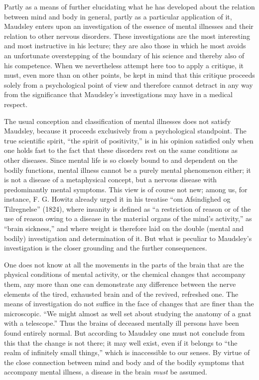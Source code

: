 \documentclass[12pt,a4paper,openany]{book}
\newcommand{\opage}[1]{\marginnote{\footnotesize\textit{[#1]}}}
\begin{document}
Partly as a means of further elucidating what he
has developed about the relation between mind and body in general,
partly as a particular application of it, Maudsley
enters upon an investigation of the essence of mental illnesses
and their relation to other nervous disorders. These
investigations are the most interesting and most instructive in
his lecture; they are also those in which he most avoids
an unfortunate overstepping of the boundary of his science and thereby also
of his competence. When we nevertheless attempt here too
to apply a critique, it must, even more than
on other points, be kept in mind that this critique proceeds solely from a
psychological point of view and therefore cannot detract in any way
from the significance that Maudsley's investigations may have in
a medical respect.

The usual conception and classification of mental illnesses
does not satisfy Maudsley, because it proceeds exclusively
from a psychological standpoint. The true scientific
spirit, ``the spirit of positivity,'' is in
his opinion satisfied only when one holds fast to the fact that these
disorders rest on the same conditions as other diseases.
Since mental life is so closely bound to and dependent
on the bodily functions, mental illness cannot
be a purely mental phenomenon either; it is not a
disease of a metaphysical concept, but a nervous disease
with predominantly mental symptoms. This view is
of course not new; among us, for instance, F. G.
\opage{323}Howitz already urged it in his treatise ``om Afsindighed og
Tilregnelse'' (1824), where insanity is defined as ``a
restriction of reason or of the use of reason owing to
a disease in the material organs of the mind's activity,''
as ``brain sickness,'' and where weight is therefore laid
on the double (mental and bodily) investigation and
determination of it. But what is peculiar to Maudsley's
investigation is the closer grounding and the further
consequences.

One does not know at all the movements in the parts of the brain that
are the physical conditions of mental activity, or
the chemical changes that accompany them, any more than
one can demonstrate any difference between the nerve elements of the tired, exhausted
brain and of the revived, refreshed one.
The means of investigation do not suffice in the face of changes that
are finer than the microscopic. ``We might almost as
well set about studying the anatomy of a gnat with a
telescope.'' Thus the brains of deceased mentally ill persons
have been found entirely normal. But according to Maudsley one must
not conclude from this that the change is not there; it may well
exist, even if it belongs to ``the realm of infinitely small
things,'' which is inaccessible to our senses. By virtue of
the close connection between mind and body and of the
bodily symptoms that accompany mental illness, a disease in the brain
\emph{must} be assumed.
\end{document}
